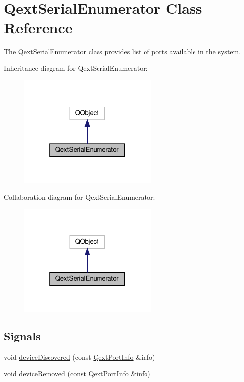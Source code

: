 \hypertarget{classQextSerialEnumerator}{}\section{Qext\+Serial\+Enumerator Class Reference}
\label{classQextSerialEnumerator}


The \hyperlink{classQextSerialEnumerator}{Qext\+Serial\+Enumerator} class provides list of ports available in the system.  




Inheritance diagram for Qext\+Serial\+Enumerator\+:\nopagebreak
\begin{figure}[H]
\begin{center}
\leavevmode
\includegraphics[width=193pt]{classQextSerialEnumerator__inherit__graph}
\end{center}
\end{figure}


Collaboration diagram for Qext\+Serial\+Enumerator\+:\nopagebreak
\begin{figure}[H]
\begin{center}
\leavevmode
\includegraphics[width=193pt]{classQextSerialEnumerator__coll__graph}
\end{center}
\end{figure}
\subsection*{Signals}
\begin{DoxyCompactItemize}
\item 
void \hyperlink{classQextSerialEnumerator_a8cd71a66dcd0079328dae193a3e58100}{device\+Discovered} (const \hyperlink{structQextPortInfo}{Qext\+Port\+Info} \&info)
\item 
void \hyperlink{classQextSerialEnumerator_a44e8a909d4bbbb759a79630e01a4f249}{device\+Removed} (const \hyperlink{structQextPortInfo}{Qext\+Port\+Info} \&info)
\end{DoxyCompactItemize}
